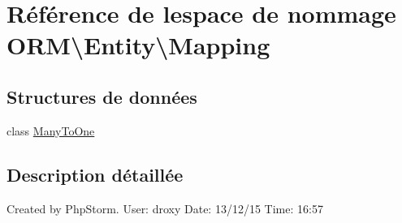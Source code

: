 \hypertarget{namespace_o_r_m_1_1_entity_1_1_mapping}{}\section{Référence de l\textquotesingle{}espace de nommage O\+RM\textbackslash{}Entity\textbackslash{}Mapping}
\label{namespace_o_r_m_1_1_entity_1_1_mapping}
\subsection*{Structures de données}
\begin{DoxyCompactItemize}
\item 
class \hyperlink{class_o_r_m_1_1_entity_1_1_mapping_1_1_many_to_one}{Many\+To\+One}
\end{DoxyCompactItemize}


\subsection{Description détaillée}
Created by Php\+Storm. User\+: droxy Date\+: 13/12/15 Time\+: 16\+:57 
